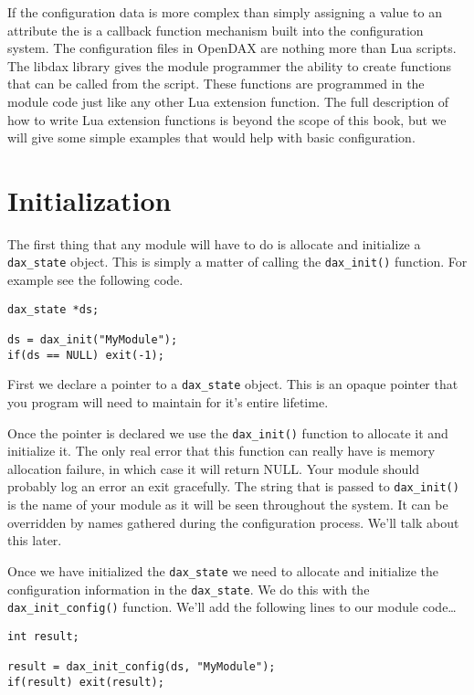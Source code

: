 If the configuration data is more complex than simply assigning a value to an attribute the is a callback function mechanism built into the configuration system.  The configuration files in OpenDAX are nothing more than Lua scripts.  The libdax library gives the module programmer the ability to create functions that can be called from the script.  These functions are programmed in the module code just like any other Lua extension function.  The full description of how to write Lua extension functions is beyond the scope of this book, but we will give some simple examples that would help with basic configuration.

\section{Initialization}

The first thing that any module will have to do is allocate and initialize a \verb|dax_state| object.  This is simply a matter of calling the \verb|dax_init()| function.  For example see the following code.

\begin{verbatim}
dax_state *ds;

ds = dax_init("MyModule");
if(ds == NULL) exit(-1);
\end{verbatim}

First we declare a pointer to a \verb|dax_state| object.  This is an opaque pointer that you program will need to maintain for it's entire lifetime.

Once the pointer is declared we use the \verb|dax_init()| function to allocate it and initialize it.  The only real error that this function can really have is memory allocation failure, in which case it will return NULL.  Your module should probably log an error an exit gracefully.  The string that is passed to \verb|dax_init()| is the name of your module as it will be seen throughout the system.  It can be overridden by names gathered during the configuration process.  We'll talk about this later.

Once we have initialized the \verb|dax_state| we need to allocate and initialize the configuration information in the \verb|dax_state|.  We do this with the \verb|dax_init_config()| function.  We'll add the following lines to our module code\ldots

\begin{verbatim}
int result;

result = dax_init_config(ds, "MyModule");
if(result) exit(result);
\end{verbatim}

